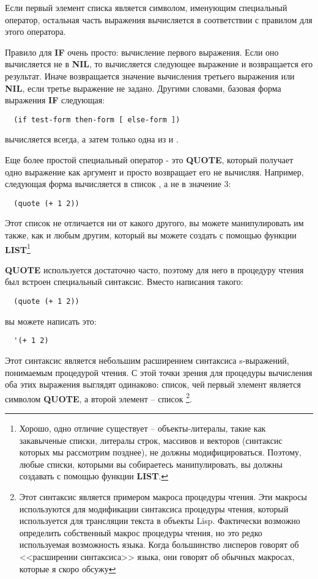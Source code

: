 Если первый элемент списка является символом, именующим специальный оператор, остальная
часть выражения вычисляется в соответствии с правилом для этого оператора.

Правило для \textbf{IF} очень просто: вычисление первого выражения. Если оно вычисляется
не в \textbf{NIL}, то вычисляется следующее выражение и возвращается его результат. Иначе
возвращается значение вычисления третьего выражения или \textbf{NIL}, если третье
выражение не задано. Другими словами, базовая форма выражения \textbf{IF} следующая:

\begin{lstlisting}
  (if test-form then-form [ else-form ])
\end{lstlisting}

 вычисляется всегда, а затем только одна из  и
.

Еще более простой специальный оператор - это \textbf{QUOTE}, который получает одно
выражение как аргумент и просто возвращает его не вычисляя. Например, следующая форма
вычисляется в список , а не в значение 3:

\begin{lstlisting}
  (quote (+ 1 2))
\end{lstlisting}

Этот список не отличается ни от какого другого, вы можете манипулировать им также, как и
любым другим, который вы можете создать с помощью функции \textbf{LIST}\footnote{Хорошо,
  одно отличие существует -- объекты-литералы, такие как закавыченые списки, литералы
  строк, массивов и векторов (синтаксис которых мы рассмотрим позднее), не должны
  модифицироваться. Поэтому, любые списки, которыми вы собираетесь манипулировать, вы
  должны создавать с помощью функции \textbf{LIST}.}

\textbf{QUOTE} используется достаточно часто, поэтому для него в процедуру чтения был
встроен специальный синтаксис. Вместо написания такого:

\begin{lstlisting}
  (quote (+ 1 2))
\end{lstlisting}

вы можете написать это:

\begin{lstlisting}
  '(+ 1 2)
\end{lstlisting}

Этот синтаксис является небольшим расширением синтаксиса s-выражений, понимаемым
процедурой чтения. С этой точки зрения для процедуры вычисления оба этих выражения
выглядят одинаково: список, чей первый элемент является символом \textbf{QUOTE}, а второй
элемент -- список \footnote{Этот синтаксис является примером макроса
  процедуры чтения. Эти макросы используются для модификации синтаксиса процедуры чтения,
  который используется для трансляции текста в объекты Lisp. Фактически возможно
  определить собственный макрос процедуры чтения, но это редко используемая возможность
  языка. Когда большинство лисперов говорят об <<расширении синтаксиса>> языка, они говорят
  об обычных макросах, которые я скоро обсужу}.


